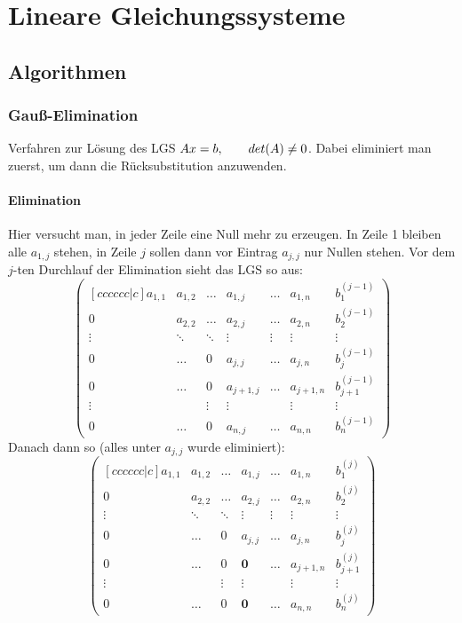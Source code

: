 \section{Lineare Gleichungssysteme}
	\subsection{Algorithmen}
		\subsubsection{Gauß-Elimination}
			Verfahren zur Lösung des LGS $ Ax = b, \hspace*{7mm} det(A) \neq 0 $. Dabei eliminiert man zuerst, um dann die Rücksubstitution anzuwenden.
			
			\paragraph{Elimination} Hier versucht man, in jeder Zeile eine Null mehr zu erzeugen. In Zeile 1 bleiben alle $ a_{1,j} $ stehen, in Zeile $ j $ sollen dann vor Eintrag $ a_{j,j} $ nur Nullen stehen. Vor dem $j$-ten Durchlauf der Elimination sieht das LGS so aus:	
			$$ \begin{pmatrix}[cccccc|c]
			a_{1,1} & a_{1,2} & \dots & a_{1,j} & \dots & a_{1,n} & b_1^{(j-1)}\\
			0 & a_{2,2} & \dots & a_{2,j} & \dots & a_{2,n} & b_2^{(j-1)} \\
			\vdots & \ddots & \ddots & \vdots & \vdots & \vdots & \vdots \\
			0 & \dots & 0 & a_{j,j} & \dots & a_{j,n} & b_j^{(j-1)} \\
			0 & \dots & 0 & a_{j+1,j} & \dots & a_{j+1,n} & b_{j+1}^{(j-1)}\\
			\vdots &   & \vdots & \vdots &  & \vdots & \vdots\\
			0 & \dots & 0 & a_{n,j} & \dots & a_{n,n} & b_{n}^{(j-1)}
			\end{pmatrix} $$
			Danach dann so (alles unter $ a_{j,j} $ wurde eliminiert):
			$$ \begin{pmatrix}[cccccc|c]
			a_{1,1} & a_{1,2} & \dots & a_{1,j} & \dots & a_{1,n} & b_1^{(j)}\\
			0 & a_{2,2} & \dots & a_{2,j} & \dots & a_{2,n} & b_2^{(j)} \\
			\vdots & \ddots & \ddots & \vdots & \vdots & \vdots & \vdots \\
			0 & \dots & 0 & a_{j,j} & \dots & a_{j,n} & b_j^{(j)} \\
			0 & \dots & 0 & \textbf{0} & \dots & a_{j+1,n} & b_{j+1}^{(j)}\\
			\vdots &   & \vdots & \vdots &  & \vdots & \vdots\\
			0 & \dots & 0 & \textbf{0} & \dots & a_{n,n} & b_{n}^{(j)}
			\end{pmatrix} $$
